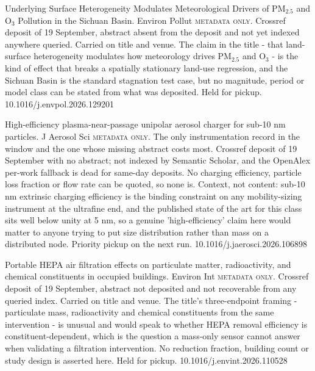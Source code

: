 \documentclass[10pt]{article}
\begin{document}
{Underlying Surface Heterogeneity Modulates Meteorological Drivers of PM$_{2.5}$ and O$_3$ Pollution in the Sichuan Basin.}
{Environ Pollut}
{\textsc{metadata only.} Crossref deposit of 19 September, abstract absent from the deposit and not yet indexed anywhere queried. Carried on title and venue. The claim in the title - that land-surface heterogeneity modulates how meteorology drives PM$_{2.5}$ and O$_3$ - is the kind of effect that breaks a spatially stationary land-use regression, and the Sichuan Basin is the standard stagnation test case, but no magnitude, period or model class can be stated from what was deposited. Held for pickup.}
{10.1016/j.envpol.2026.129201}


{High-efficiency plasma-near-passage unipolar aerosol charger for sub-10 nm particles.}
{J Aerosol Sci}
{\textsc{metadata only.} The only instrumentation record in the window and the one whose missing abstract costs most. Crossref deposit of 19 September with no abstract; not indexed by Semantic Scholar, and the OpenAlex per-work fallback is dead for same-day deposits. No charging efficiency, particle loss fraction or flow rate can be quoted, so none is. Context, not content: sub-10 nm extrinsic charging efficiency is the binding constraint on any mobility-sizing instrument at the ultrafine end, and the published state of the art for this class sits well below unity at 5 nm, so a genuine 'high-efficiency' claim here would matter to anyone trying to put size distribution rather than mass on a distributed node. Priority pickup on the next run.}
{10.1016/j.jaerosci.2026.106898}


{Portable HEPA air filtration effects on particulate matter, radioactivity, and chemical constituents in occupied buildings.}
{Environ Int}
{\textsc{metadata only.} Crossref deposit of 19 September, abstract not deposited and not recoverable from any queried index. Carried on title and venue. The title's three-endpoint framing - particulate mass, radioactivity and chemical constituents from the same intervention - is unusual and would speak to whether HEPA removal efficiency is constituent-dependent, which is the question a mass-only sensor cannot answer when validating a filtration intervention. No reduction fraction, building count or study design is asserted here. Held for pickup.}
{10.1016/j.envint.2026.110528}
\end{document}
